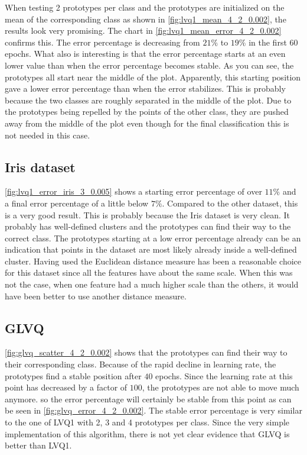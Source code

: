 \documentclass[twoside, a4paper, fleqn, reqno]{article}
\begin{document}
	When testing 2 prototypes per class and the prototypes are initialized on the mean of the corresponding class
	as shown in \autoref{fig:lvq1_mean_4_2_0.002}, the results look very promising.
	The chart in \autoref{fig:lvq1_mean_error_4_2_0.002} confirms this. The error percentage is decreasing from $21\%$ to $19\%$ in the first $60$ epochs.
	What also is interesting is that the error percentage starts at an even lower value than when the error percentage becomes stable.
	As you can see, the prototypes all start near the middle of the plot. Apparently, this starting position
	gave a lower error percentage than when the error stabilizes. This is probably because the two classes are
	roughly separated in the middle of the plot. Due to the prototypes being repelled by the points of the other class,
	they are pushed away from the middle of the plot even though for the final classification this is not needed in this case.\\

	\subsection*{Iris dataset}
	\autoref{fig:lvq1_error_iris_3_0.005} shows a starting error percentage of over $11\%$ and a final error percentage of a little below $7\%$.
	Compared to the other dataset, this is a very good result. This is probably because the Iris dataset is very clean.
	It probably has well-defined clusters and the prototypes can find their way to the correct class.
	The prototypes starting at a low error percentage already can be an indication that points in the dataset are most likely already inside a
	well-defined cluster. Having used the Euclidean distance measure has been a reasonable choice for this dataset since all the features
	have about the same scale. When this was not the case, when one feature had a much higher scale than the others, it would have been better
	to use another distance measure.\\

	\subsection*{GLVQ}
	\autoref{fig:glvq_scatter_4_2_0.002} shows that the prototypes can find their way to their corresponding class.
	Because of the rapid decline in learning rate, the prototypes find a stable position after $40$ epochs.
	Since the learning rate at this point has decreased by a factor of $100$, the prototypes are not able to move much anymore.
	so the error percentage will certainly be stable from this point as can be seen in \autoref{fig:glvq_error_4_2_0.002}.
	The stable error percentage is very similar to the one of LVQ1 with 2, 3 and 4 prototypes per class.
	Since the very simple implementation of this algorithm, there is not yet clear evidence that GLVQ is better than LVQ1.
\end{document}
